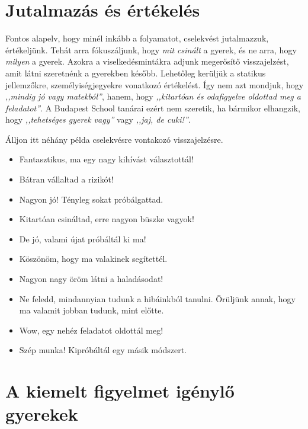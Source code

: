 \section{Jutalmazás és értékelés}
\label{jutalmazas}

Fontos alapelv, hogy minél inkább a folyamatot, cselekvést jutalmazzuk, értékeljünk. Tehát arra fókuszáljunk, hogy
 \emph{mit csinált} a gyerek, és ne arra, hogy \emph{milyen} a gyerek. Azokra
a viselkedésmintákra adjunk megerősítő visszajelzést, amit látni szeretnénk a gyerekben később. 
Lehetőleg kerüljük a statikus jellemzőkre, személyiségjegyekre vonatkozó értékelést. Így nem azt mondjuk, hogy
\emph{,,mindig jó vagy matekból''}, hanem, hogy \emph{,,kitartóan és odafigyelve oldottad meg a feladatot''}. A Budapest School tanárai
ezért nem szeretik, ha bármikor elhangzik, hogy \emph{,,tehetséges gyerek vagy''} vagy \emph{,,jaj, de cuki!''}. 

Álljon itt néhány példa cselekvésre vontakozó visszajelzésre. 

\begin{itemize}

      \item
            Fantasztikus, ma egy nagy kihívást választottál!
      \item
            Bátran vállaltad a rizikót!
      \item
            Nagyon jó! Tényleg sokat próbálgattad.
      \item
            Kitartóan csináltad, erre nagyon büszke vagyok!
      \item
            De jó, valami újat próbáltál ki ma!
      \item
            Köszönöm, hogy ma valakinek segítettél.
      \item
            Nagyon nagy öröm látni a haladásodat!
      \item
            Ne feledd, mindannyian tudunk a hibáinkból tanulni. Örüljünk annak,
            hogy ma valamit jobban tudunk, mint előtte.
      \item
            Wow, egy nehéz feladatot oldottál meg!
      \item
            Szép munka! Kipróbáltál egy másik módszert.
\end{itemize}





\section{A kiemelt figyelmet igénylő
  gyerekek}\label{sec:kiemelt_figyelem}

